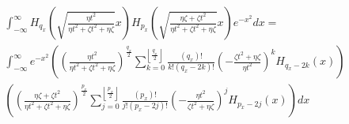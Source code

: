 \documentclass{article}
\begin{document}
\begin{multline}
  \int_{-\infty}^\infty H_{q_x}\left(\sqrt{\frac{\eta t^2}{\eta t^2 + \zeta t^2 + \eta \zeta}} x\right) H_{p_x}\left(\sqrt{\frac{\eta \zeta + \zeta t^2}{\eta t^2 + \zeta t^2 + \eta \zeta}} x\right) e^{-x^2} dx = \\
  \int_{-\infty}^\infty e^{-x^2} \left(\left(\frac{\eta t^2}{\eta t^2 + \zeta t^2 + \eta \zeta}\right)^{\frac{q_x}{2}} \sum_{k = 0}^{\left\lfloor\frac{q_x}{2}\right\rfloor}\frac{(q_x)!}{k!(q_x - 2k)!}\left(-\frac{\zeta t^2 + \eta \zeta}{\eta t^2}\right)^k H_{q_x - 2k}(x)\right)\\
  \left(\left(\frac{\eta\zeta + \zeta t^2}{\eta t^2 + \zeta t^2 + \eta \zeta}\right)^{\frac{p_x}{2}}\sum_{j = 0}^{\left\lfloor\frac{p_x}{2}\right\rfloor}\frac{(p_x)!}{j!(p_x - 2j)!}\left(-\frac{\eta t^2}{\zeta t^2 + \eta \zeta}\right)^j H_{p_x - 2j}(x)\right) dx
\end{multline}
\end{document}
